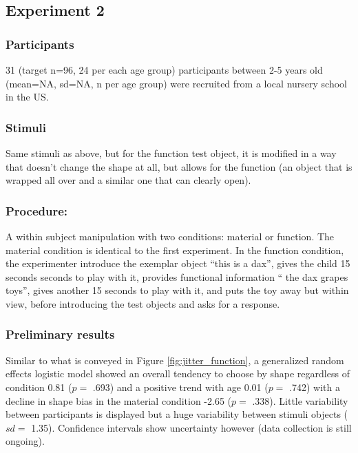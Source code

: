 \documentclass[10pt, letterpaper]{article}
\begin{document}
\hypertarget{experiment-2}{%
\subsection{Experiment 2}\label{experiment-2}}

\hypertarget{participants-1}{%
\subsubsection{Participants}\label{participants-1}}

31 (target n=96, 24 per each age group) participants between 2-5 years
old (mean=NA, sd=NA, n per age group) were recruited from a local
nursery school in the US.

\hypertarget{stimuli-1}{%
\subsubsection{Stimuli}\label{stimuli-1}}

Same stimuli as above, but for the function test object, it is modified
in a way that doesn't change the shape at all, but allows for the
function (an object that is wrapped all over and a similar one that can
clearly open).

\hypertarget{procedure-1}{%
\subsubsection{Procedure:}\label{procedure-1}}

A within subject manipulation with two conditions: material or function.
The material condition is identical to the first experiment. In the
function condition, the experimenter introduce the exemplar object
``this is a dax'', gives the child 15 seconds seconds to play with it,
provides functional information `` the dax grapes toys'', gives another
15 seconds to play with it, and puts the toy away but within view,
before introducing the test objects and asks for a response.

\hypertarget{preliminary-results}{%
\subsubsection{Preliminary results}\label{preliminary-results}}

Similar to what is conveyed in Figure \ref{fig:jitter_function}, a
generalized random effects logistic model showed an overall tendency to
choose by shape regardless of condition 0.81 (\(p=\) .693) and a
positive trend with age 0.01 (\(p=\) .742) with a decline in shape bias
in the material condition -2.65 (\(p=\) .338). Little variability
between participants is displayed but a huge variability between stimuli
objects (\(sd=\) 1.35). Confidence intervals show uncertainty however
(data collection is still ongoing).
\end{document}
